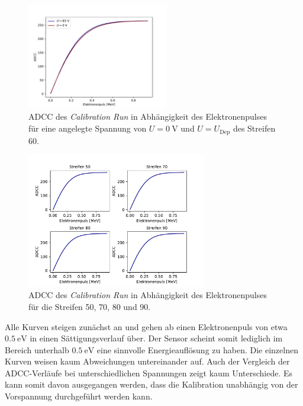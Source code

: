 \begin{figure}
  \centering
  \includegraphics[width=0.55\textwidth]{plots/0V_80V_Vergleich.pdf}
  \caption{ADCC des \textit{Calibration Run} in Abhängigkeit des Elektronenpulses für eine angelegte Spannung von $U=\SI{0}{\volt}$ und $U=U_{\mathrm{Dep}}$ des Streifen 60.}
  \label{fig:0V80V}
\end{figure}
\FloatBarrier
\begin{figure}
  \centering
  \includegraphics[width=0.7\textwidth]{plots/Kalib_Kanal_Plot.pdf}
  \caption{ADCC des \textit{Calibration Run} in Abhängigkeit des Elektronenpulses für die Streifen 50, 70, 80 und 90.}
  \label{fig:KanalPlot}
\end{figure}
\FloatBarrier
Alle Kurven steigen zunächst an und gehen ab einen Elektronenpuls von etwa $\SI{0.5}{\electronvolt}$ in einen Sättigungsverlauf über. Der Sensor scheint somit lediglich im Bereich unterhalb $\SI{0.5}{\electronvolt}$ eine sinnvolle Energieauflösung zu haben.
Die einzelnen Kurven weisen kaum Abweichungen untereinander auf. Auch der Vergleich der ADCC-Verläufe bei unterschiedlichen Spannungen zeigt kaum Unterschiede. Es kann somit davon ausgegangen werden, dass die Kalibration unabhängig von der Vorspannung durchgeführt werden kann.

